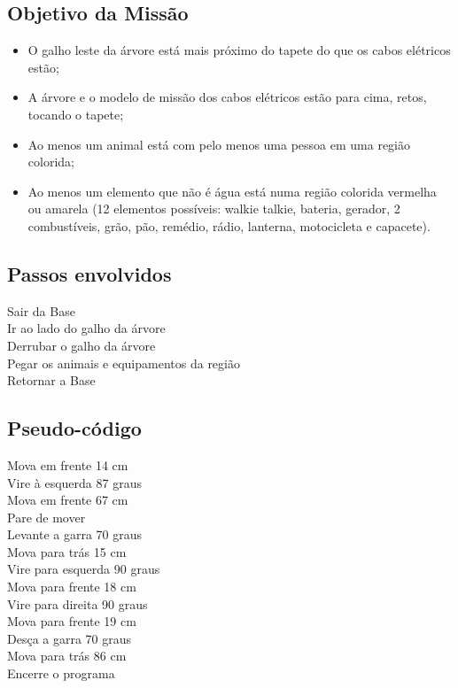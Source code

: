 \documentclass{article}
\begin{document}
	\subsection{Objetivo da Missão}
		\begin{itemize}
			\item O galho leste da árvore está mais próximo do tapete do que os cabos elétricos estão;
			\item A árvore e o modelo de missão dos cabos elétricos estão para cima, retos, tocando o tapete;
			\item Ao menos um animal está com pelo menos uma pessoa em uma região colorida;
			\item Ao menos um elemento que não é água está numa região colorida vermelha ou amarela (12 elementos possíveis: walkie talkie, bateria, gerador, 2 combustíveis, grão, pão, remédio, rádio, lanterna, motocicleta e capacete).
		\end{itemize}

	\subsection{Passos envolvidos}
		Sair da Base\\
    	Ir ao lado do galho da árvore\\
    	Derrubar o galho da árvore\\
    	Pegar os animais e equipamentos da região\\
   		Retornar a Base\\

   	\subsection{Pseudo-código}
   		Mova em frente 14 cm\\
	    Vire à esquerda 87 graus\\
	    Mova em frente 67 cm\\
	    Pare de mover\\
		Levante a garra 70 graus\\
	    Mova para trás 15 cm\\
	    Vire para esquerda 90 graus\\
	    Mova para frente 18 cm\\
	    Vire para direita 90 graus\\
	    Mova para frente 19 cm\\
	    Desça a garra 70 graus\\
	    Mova para trás 86 cm\\
	    Encerre o programa\\
\end{document}
